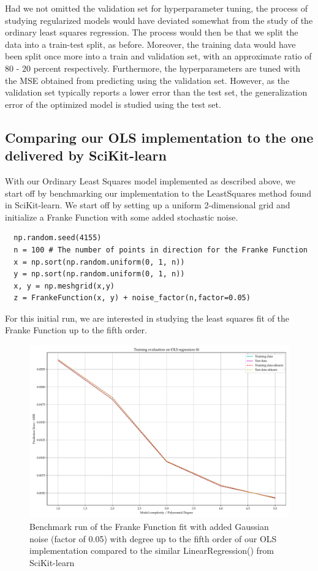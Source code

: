 \documentclass[11pt, a4paper]{article}
\begin{document}
Had we not omitted the validation set for hyperparameter tuning, the process of studying regularized models would have deviated somewhat from the study of the ordinary least squares regression. The process would then be that we split the data into a train-test split, as before. Moreover, the training data would have been split once more into a train and validation set, with an approximate ratio of 80 - 20 percent respectively. Furthermore, the hyperparameters are tuned with the MSE obtained from predicting using the validation set. However, as the validation set typically reports a lower error than the test set, the generalization error of the optimized model is studied using the test set. \cite{Goodfellow2016}

\subsection*{Comparing our OLS implementation to the one delivered by SciKit-learn}
With our Ordinary Least Squares model implemented as described above, we start off by benchmarking our implementation to the LeastSquares method found in SciKit-learn. \cite{scikit-learn} We start off by setting up a uniform 2-dimensional grid and initialize a Franke Function with some added stochastic noise.

\begin{lstlisting}
  np.random.seed(4155)
  n = 100 # The number of points in direction for the Franke Function
  x = np.sort(np.random.uniform(0, 1, n))
  y = np.sort(np.random.uniform(0, 1, n))
  x, y = np.meshgrid(x,y)
  z = FrankeFunction(x, y) + noise_factor(n,factor=0.05)
\end{lstlisting}

For this initial run, we are interested in studying the least squares fit of the Franke Function up to the fifth order. 

\begin{figure}[h]
  \centering
  \includegraphics[scale=0.5]{figures/EX1_franke_function_OLS_evaluate_fit_1.pdf}
  \caption{\label{fig:OLS_franke_1} Benchmark run of the Franke Function fit with added Gaussian noise (factor of 0.05) with degree up to the fifth order of our OLS implementation compared to the similar LinearRegression() from SciKit-learn}
\end{figure}
\end{document}
